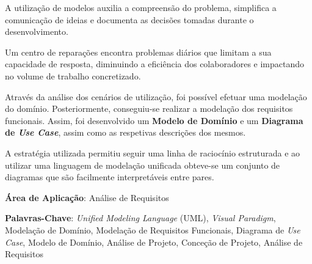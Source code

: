 \documentclass[a4paper,12pt]{scrreprt}
\begin{document}

\makecover




\renewenvironment{abstract}
{\par\noindent\textbf{\Large\abstractname}\par\bigskip}
{}

\begin{flushleft}
    \begin{abstract}
        A utilização de modelos auxilia a compreensão do problema, simplifica a comunicação de ideias e documenta as decisões tomadas durante o desenvolvimento.
        
        Um centro de reparações encontra problemas diários que limitam a sua capacidade de resposta,
        diminuindo a eficiência dos colaboradores e impactando no volume de trabalho concretizado.
        
        Através da análise dos cenários de utilização, foi possível efetuar uma modelação do domínio.
        Posteriormente, conseguiu-se realizar a modelação dos requisitos funcionais.
        Assim, foi desenvolvido um \textbf{Modelo de Domínio} e um \textbf{Diagrama de \textit{Use Case}},
        assim como as respetivas descrições dos mesmos.
        
        A estratégia utilizada permitiu seguir uma linha de raciocínio estruturada e ao utilizar uma linguagem de modelação unificada obteve-se
        um conjunto de diagramas que são facilmente interpretáveis entre pares.
        
        \par \textbf{Área de Aplicação}: Análise de Requisitos
        \par \textbf{Palavras-Chave}: \textit{Unified Modeling Language} (UML), \textit{Visual Paradigm}, Modelação de Domínio, Modelação de Requisitos Funcionais, Diagrama de \textit{Use Case}, Modelo de Domínio, Análise de Projeto, Conceção de Projeto, Análise de Requisitos
    \end{abstract}
\end{flushleft}
\end{document}
